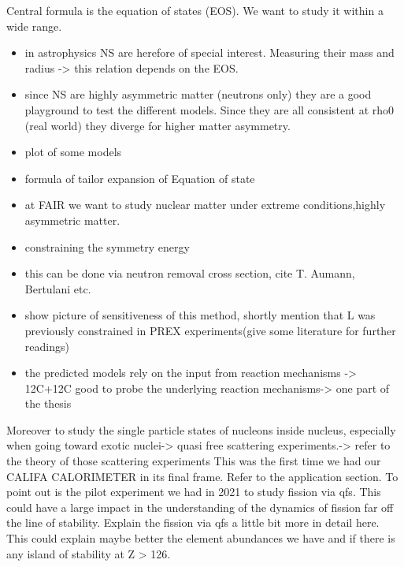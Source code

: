 



Central formula is the equation of states (EOS). We want to study it within a wide range. 
\begin{itemize}
\item in astrophysics NS are herefore of special interest. Measuring their mass and radius -> this relation depends on the EOS. 
\item since NS are highly asymmetric matter (neutrons only) they are a good playground to test the different models. Since they are all consistent at rho0 (real world) they diverge for higher matter asymmetry. 
\item plot of some models
\item formula of tailor expansion of Equation of state
\item at FAIR we want to study  nuclear matter under extreme conditions,highly asymmetric matter. 
\item constraining the symmetry energy
\item this can be done via neutron removal cross section, cite T. Aumann, Bertulani etc.
\item show picture of sensitiveness of this method, shortly mention that L was previously constrained in PREX experiments(give some literature for further readings)
\item the predicted models rely on the input from reaction mechanisms -> 12C+12C good to probe the underlying reaction mechanisms-> one part of the thesis
\end{itemize}
Moreover to study the single particle states of nucleons inside nucleus, especially when going toward exotic nuclei-> quasi free scattering experiments.-> refer to the theory of those scattering experiments
This was the first time we had our CALIFA CALORIMETER in its final frame. 
Refer to the application section. \newline
To point out is the pilot experiment we had in 2021 to study fission via qfs. This could have a large impact in the understanding of the dynamics of fission far off the line of stability. \newline
Explain the fission via qfs a little bit more in detail here.\newline
This could explain maybe better the element abundances we have and if there is any island of stability at Z > 126.

